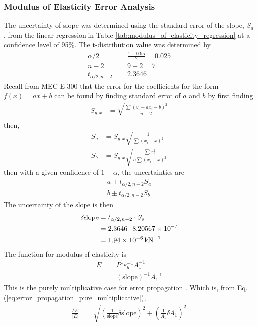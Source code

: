\subsubsection{Modulus of Elasticity Error Analysis}
The uncertainty of slope was determined using the standard error of the slope, $S_a$, from the linear regression in Table \ref{tab:modulus_of_elasticity_regression} at a confidence level of 95\%. The t-distribution value was determined by 
\begin{align*}
    \alpha/2 &= \frac{1 - 0.95}{2} = 0.025 \\
    n - 2 &= 9 - 2 = 7 \\
    t_{\alpha/2, n-2} &= 2.3646
\end{align*}
Recall from MEC E 300 that the error for the coefficients for the form $f(x) = ax +b$ can be found by finding standard error of $a$ and $b$ by first finding 
\begin{align*}
    S_{y,x} &= \sqrt{\frac{\sum (y_i - a x_i - b)^2}{n-2}} \\
\end{align*}
then,
\begin{align*}
    S_a &= S_{y,x} \sqrt{\frac{1}{\sum (x_i - \bar{x})^2}} \\
    S_b &= S_{y,x} \sqrt{\frac{\sum x_i^2}{n \sum (x_i - \bar{x})^2}}
\end{align*}
then with a given confidence of $1 - \alpha$, the uncertainties are 
\begin{align*}
    a \pm t_{\alpha/2, n-2} S_a \\
    b \pm t_{\alpha/2, n-2} S_b
\end{align*}
The uncertainty of the slope is then \cite{wheeler_ganji}
\begin{align*}
    \delta \text{slope} &= t_{\alpha/2, n-2} \cdot S_a \\
    &= 2.3646 \cdot 8.20567 \times 10^{-7} \\
    &= \qty{1.94E-06}{\per\kilo\newton}
\end{align*}
The function for modulus of elasticity is 
\begin{align*}
    E &= P^{1} \varepsilon_b^{-1} A_1^{-1} \\
    &= (\text{slope})^{-1} A_1^{-1}
\end{align*}
This is the purely multiplicative case for error propagation \cite{wheeler_ganji}.  Which is, from Eq. (\ref{eq:error_propagation_pure_multiplicative}),
\begin{align*}
    \frac{\delta E}{|E|} &= \sqrt{\left(\frac{1}{\text{slope}} \delta \text{slope}\right)^2 + \left(\frac{1}{A_1} \delta A_1\right)^2}
\end{align*}
